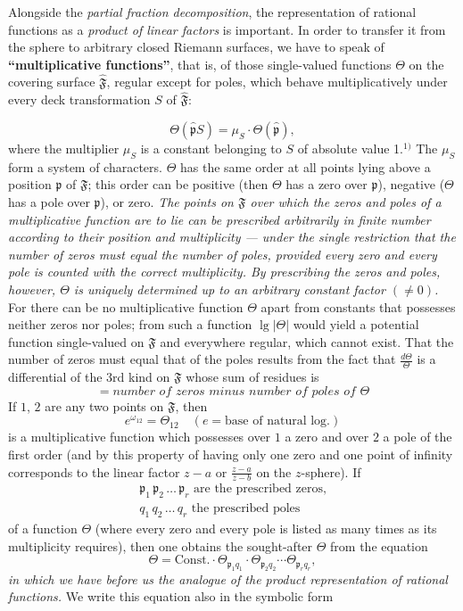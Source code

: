 \documentclass{article}
\begin{document}
Alongside the \emph{partial fraction decomposition}, the representation of rational functions as a \emph{product of linear factors} is important. In order to transfer it from the sphere to arbitrary closed Riemann surfaces, we have to speak of \textbf{``multiplicative functions''}, that is, of those single-valued functions $\Theta$ on the covering surface $\hat{\mathfrak{F}}$, regular except for poles, which behave multiplicatively under every deck transformation $S$ of $\hat{\mathfrak{F}}$:

\[ \Theta(\hat{\mathfrak{p}}S) = \mu_S \cdot \Theta(\hat{\mathfrak{p}}), \]
where the multiplier $\mu_S$ is a constant belonging to $S$ of absolute value 1.${}^{1)}$ The $\mu_S$ form a system of characters. $\Theta$ has the same order at all points lying above a position $\mathfrak{p}$ of $\mathfrak{F}$; this order can be positive (then $\Theta$ has a zero over $\mathfrak{p}$), negative ($\Theta$ has a pole over $\mathfrak{p}$), or zero. \emph{The points on $\mathfrak{F}$ over which the zeros and poles of a multiplicative function are to lie can be prescribed arbitrarily in finite number according to their position and multiplicity --- under the single restriction that the number of zeros must equal the number of poles, provided every zero and every pole is counted with the correct multiplicity. By prescribing the zeros and poles, however, $\Theta$ is uniquely determined up to an arbitrary constant factor $(\neq 0)$.} For there can be no multiplicative function $\Theta$ apart from constants that possesses neither zeros nor poles; from such a function $\lg |\Theta|$ would yield a potential function single-valued on $\mathfrak{F}$ and everywhere regular, which cannot exist. That the number of zeros must equal that of the poles results from the fact that $\frac{d\Theta}{\Theta}$ is a differential of the 3rd kind on $\mathfrak{F}$ whose sum of residues is
\[ = \textit{number of zeros minus number of poles of } \Theta \]
If $1$, $2$ are any two points on $\mathfrak{F}$, then
\[ e^{\omega_{12}} = \Theta_{12} \quad (e = \text{base of natural log.}) \]
is a multiplicative function which possesses over $1$ a zero and over $2$ a pole of the first order (and by this property of having only one zero and one point of infinity corresponds to the linear factor $z - a$ or $\frac{z-a}{z-b}$ on the $z$-sphere). If
\[ \begin{gathered}
\mathfrak{p}_1 \, \mathfrak{p}_2 \, \dots \, \mathfrak{p}_r \text{ are the prescribed zeros,} \\
q_1 \, q_2 \, \dots \, q_r \text{ the prescribed poles}
\end{gathered} \]
of a function $\Theta$ (where every zero and every pole is listed as many times as its multiplicity requires), then one obtains the sought-after $\Theta$ from the equation
\[ \Theta = \text{Const.} \cdot \Theta_{\mathfrak{p}_1 q_1} \cdot \Theta_{\mathfrak{p}_2 q_2} \cdots \Theta_{\mathfrak{p}_r q_r}, \]
\emph{in which we have before us the analogue of the product representation of rational functions.} We write this equation also in the symbolic form
\end{document}
